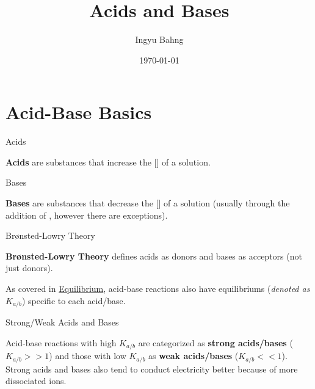 \documentclass[10pt]{article}
\title{Acids and Bases}
\date{\today}
\author{Ingyu Bahng}
\begin{document}


\section{Acid-Base Basics}

  \begin{core}{Acids}

    \textbf{Acids} are substances that increase the [] of a solution.

    

  \end{core}

  \begin{core}{Bases}

    \textbf{Bases} are substances that decrease the [] of a solution (usually through the addition of , however there are exceptions).

    
    
  \end{core}
 
  \begin{core}{Brønsted-Lowry Theory}

     \textbf{Brønsted-Lowry Theory} defines acids as  donors and bases as  acceptors (not just  donors).
     
  \end{core}

  As covered in \href{../equilibrium/equilibrium.pdf}{Equilibrium}, acid-base reactions also have equilibriums (\textit{denoted as $K_{a/b}$}) specific to each acid/base.

  \begin{core}{Strong/Weak Acids and Bases}
   
    Acid-base reactions with high $K_{a/b}$ are categorized as \textbf{strong acids/bases} ($K_{a/b} >> 1$) and those with low $K_{a/b}$ as \textbf{weak acids/bases} ($K_{a/b} << 1$). Strong acids and bases also tend to conduct electricity better because of more dissociated ions.

  \end{core}
  
\end{document}
